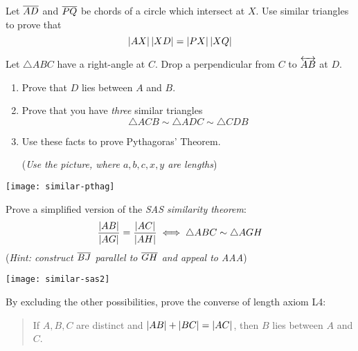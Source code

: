 \begin{exercises}
	\exstart%
	Let $\overline{AD}$ and $\overline{PQ}$ be chords of a circle which intersect at $X$. Use similar triangles to prove that
  \[
  	\left| AX\right|\left| XD\right|=\left| PX\right|\left| XQ\right|
  \]

	\goodbreak

	\begin{enumerate}\setcounter{enumi}{1}
	  \item Let $\triangle ABC$ have a right-angle at $C$. Drop a perpendicular from $C$ to $\overleftrightarrow{AB}$ at $D$.\par
	  \begin{minipage}[t]{0.6\linewidth}\vspace{-8pt}
		  \begin{enumerate}\itemsep0pt
		    \item Prove that $D$ lies between $A$ and $B$.
		    \item Prove that you have \emph{three} similar triangles
		    \[
		    	\triangle ACB\sim\triangle ADC\sim\triangle CDB
		    \]
		  	\item Use these facts to prove Pythagoras' Theorem.\par
		  	(\emph{Use the picture, where $a,b,c,x,y$ are lengths})
			\end{enumerate}
		\end{minipage}
		\hfill
		\begin{minipage}[t]{0.39\linewidth}\vspace{0pt}
			\flushright
			\texttt{[image: similar-pthag]}
		\end{minipage}
	

	  \begin{minipage}[t]{0.65\linewidth}\vspace{0pt}
	  	\item Prove a simplified version of the \emph{SAS similarity theorem}:
	    \[
	    	\frac{\left| AB\right|}{\left| AG\right|}=\frac{\left| AC\right|}{\left| AH\right|}\iff\triangle ABC\sim\triangle AGH
	    \]
	    (\emph{Hint: construct $\overline{BJ}$ parallel to $\overline{GH}$ and appeal to AAA})
	  \end{minipage}
	  \hfill
	  \begin{minipage}[t]{0.34\linewidth}\vspace{-5pt}
	  	\flushright
	  	\texttt{[image: similar-sas2]}
	  \end{minipage}
	
	
		\item By excluding the other possibilities, prove the converse of length axiom L4:
		\begin{quote}
			If $A,B,C$ are distinct and $\left| AB\right|+\left| BC\right|=\left| AC\right|$, then $B$ lies between $A$ and $C$.
		\end{quote}
		

\end{enumerate}
\end{exercises}
